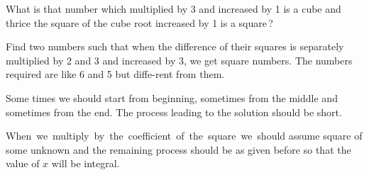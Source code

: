 \documentclass[]{article}
\begin{document}
\begin{quote}  {
}  \end{quote}

{What is that number which multiplied by 3 and increased by 1 is a cube
and thrice the square of the cube root increased by 1 is a square\,?}

\begin{quote}  {
}  \end{quote}

{Find two numbers such that when the difference of their squares is
separately multiplied by 2 and 3 and increased by 3, we get square
numbers. The numbers required are like 6 and 5 but diffe-rent from them.}

\begin{quote}  {
}  \end{quote}

{Some times we should start from beginning, sometimes from the middle
and sometimes from the end. The process leading to the solution should
be short.}

\begin{quote}  {
}  \end{quote}

{When \,we \,multiply \,by \,the \,coefficient \,of \,the \,square \,we \,should assume
square of some unknown and the remaining process should be as given
before so that the value of $x$ will be integral.\\
}
\newpage
\large

\begin{quote}  {
}  \end{quote}
\end{document}
